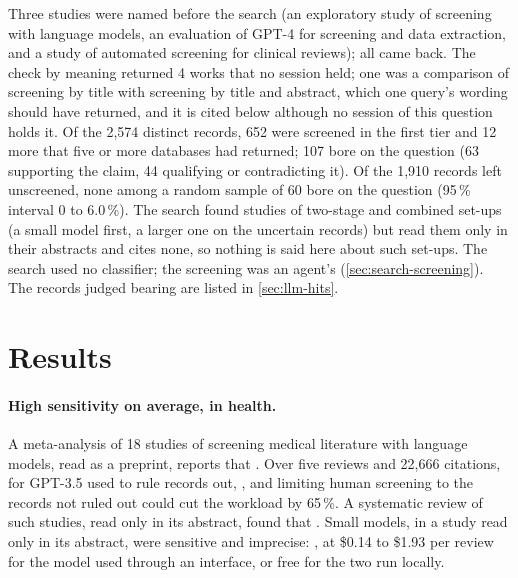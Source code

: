Three studies were named before the search (an exploratory study of
screening with language models, an evaluation of GPT-4 for screening and
data extraction, and a study of automated screening for clinical
reviews); all came back.
The check by meaning returned 4 works that no session held; one was a
comparison of screening by title with screening by title and abstract,
which one query's wording should have returned, and it is cited below
although no session of this question holds it.
Of the 2,574 distinct records, 652 were screened in the first tier and 12
more that five or more databases had returned; 107 bore on the question
(63 supporting the claim, 44 qualifying or contradicting it).
Of the 1,910 records left unscreened, none among a random sample of 60
bore on the question (95\,\% interval 0 to 6.0\,\%).
The search found studies of two-stage and combined set-ups (a small model
first, a larger one on the uncertain records) but read them only in their
abstracts and cites none, so nothing is said here about such set-ups.
The search used no classifier; the screening was an agent's
(\cref{sec:search-screening}).
The records judged bearing are listed in \cref{sec:llm-hits}.

\section{Results}
\label{sec:llm-results}

\paragraph{High sensitivity on average, in health.}
A meta-analysis of 18 studies of screening medical literature with
language models, read as a preprint, reports that
.
Over five reviews and 22,666 citations, for GPT-3.5 used to rule records
out, ,
and limiting human screening to the records not ruled out could cut the
workload by 65\,\%.
A systematic review of such studies, read only in its abstract, found
that .
Small models, in a study read only in its abstract, were sensitive and
imprecise: , at
\$0.14 to \$1.93 per review for the model used through an interface, or
free for the two run locally.

